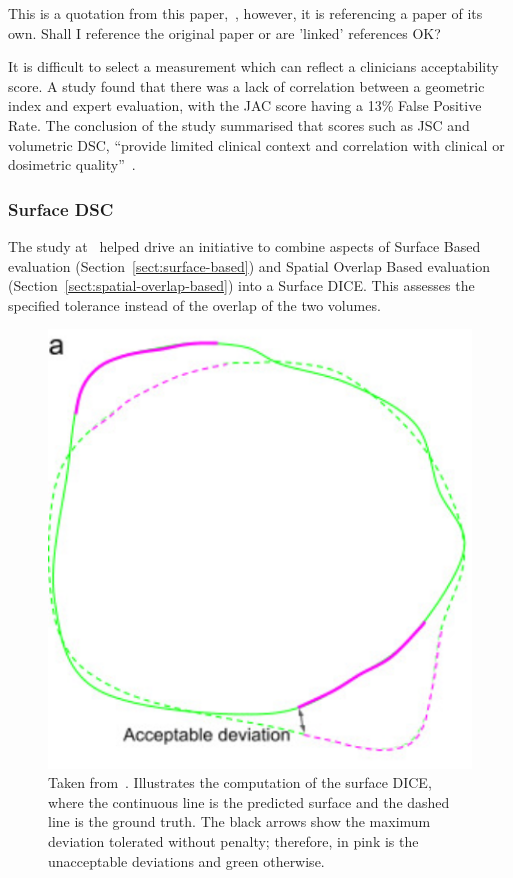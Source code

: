 \documentclass[12pt,twoside]{report}
\begin{document}
\begin{warning}
  This is a quotation from this paper,~\cite{Sherer2021-le}, however, it is referencing a paper of its own. Shall I reference the original paper or are 'linked' references OK?
\end{warning}

It is difficult to select a measurement which can reflect a clinicians acceptability score. A study found that there was a lack of correlation between a geometric index and expert evaluation, with the JAC score having a 13\% False Positive Rate. The conclusion of the study summarised that scores such as JSC and volumetric DSC, ``provide limited clinical context and correlation with clinical or dosimetric quality''~\cite{Sherer2021-le}.


\subsubsection{Surface DSC}\label{sect:surface-DSC}

The study at~\cite{Sherer2021-le} helped drive an initiative to combine aspects of Surface Based evaluation (Section~\ref{sect:surface-based}) and Spatial Overlap Based evaluation (Section~\ref{sect:spatial-overlap-based}) into a Surface DICE. This assesses the specified tolerance instead of the overlap of the two volumes.

\begin{figure}[H]
  \centering
  \includegraphics[width=0.3\linewidth]{../figures/Surface-dice.png}
  \caption{Taken from~\cite{Nikolov2021-xe}. Illustrates the computation of the surface DICE, where the continuous line is the predicted surface and the dashed line is the ground truth. The black arrows show the maximum deviation tolerated without penalty; therefore, in pink is the unacceptable deviations and green otherwise.}
\end{figure}
\end{document}
